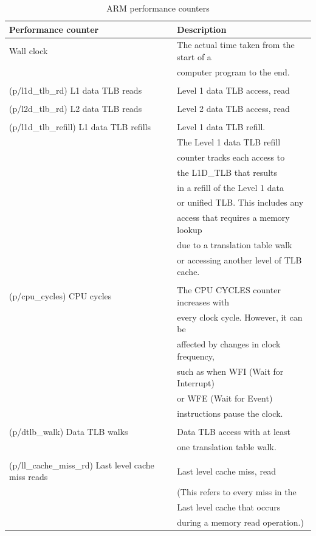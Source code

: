 \documentclass[11pt]{article}
\begin{document}
\begin{table}[htbp]
\caption{\label{tab:orgba41311}ARM performance counters}
\centering
\begin{tabular}{|l|l|}
\hline
Performance counter & Description \\
\hline
Wall clock & The actual time taken from the start of a \\
 & computer program to the end. \\
 & \\
(p/l1d\_tlb\_rd) L1 data TLB reads & Level 1 data TLB access, read \\
 & \\
(p/l2d\_tlb\_rd) L2 data TLB reads & Level 2 data TLB access, read \\
 & \\
(p/l1d\_tlb\_refill) L1 data TLB refills & Level 1 data TLB refill. \\
 & The Level 1 data TLB refill \\
 & counter tracks each access to \\
 & the L1D\_TLB that results \\
 & in a refill of the Level 1 data \\
 & or unified TLB. This includes any \\
 & access that requires a memory lookup \\
 & due to a translation table walk \\
 & or accessing another level of TLB cache. \\
 & \\
(p/cpu\_cycles) CPU cycles & The CPU CYCLES counter increases with \\
 & every clock cycle. However, it can be \\
 & affected by changes in clock frequency, \\
 & such as when WFI (Wait for Interrupt) \\
 & or WFE (Wait for Event) \\
 & instructions pause the clock. \\
 & \\
(p/dtlb\_walk) Data TLB walks & Data TLB access with at least \\
 & one translation table walk. \\
 & \\
(p/ll\_cache\_miss\_rd) Last level cache miss reads & Last level cache miss, read \\
 & (This refers to every miss in the \\
 & Last level cache that occurs \\
 & during a memory read operation.) \\
\hline
\end{tabular}
\end{table}
\end{document}
